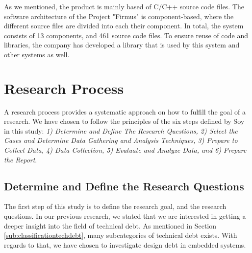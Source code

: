As we mentioned, the product is mainly based of C/C++ source code files. The software architecture of the Project "Firmus" is component-based, where the different source files are divided into each their component. In total, the system consists of 13 components, and 461 source code files. To ensure reuse of code and libraries, the company has developed a library that is used by this system and other systems as well.




% 



\section{Research Process}
\label{sec:researchprocess}
A research process provides a systematic approach on how to fulfill the goal of a research. We have chosen to follow the principles of the six steps defined by Soy\cite{soysusan} in this study: \textit{1) Determine and Define The Research Questions, 2) Select the Cases and Determine Data Gathering and Analysis Techniques, 3) Prepare to Collect Data, 4) Data Collection, 5) Evaluate and Analyze Data, and 6) Prepare the Report}.


\subsection{Determine and Define the Research Questions} %
The first step of this study is to define the research goal, and the research questions. In our previous research\cite{forprosjekt}, we stated that we are interested in getting a deeper insight into the field of technical debt. As mentioned in Section \ref{sub:classificationtechdebt}, many subcategories of technical debt exists. With regards to that, we have chosen to investigate design debt in embedded systems.


